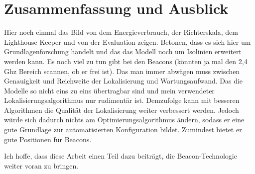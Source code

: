 \chapter{Zusammenfassung und Ausblick}

Hier noch einmal das Bild von dem Energieverbrauch, der Richterskala, dem Lighthouse Keeper und von der Evaluation zeigen. Betonen, dass es sich hier um Grundlagenforschung handelt und das das Modell noch um Isolinien erweitert werden kann. Es noch viel zu tun gibt bei den Beacons (könnten ja mal den 2,4 Ghz Bereich scannen, ob er frei ist). Das man immer abwägen muss zwischen Genauigkeit und Reichweite der Lokalisierung und Wartungsaufwand. Das die Modelle so nicht eins zu eins übertragbar sind und mein verwendeter Lokalisierungsalgorithmus nur rudimentär ist. Demzufolge kann mit besseren Algorithmen die Qualität der Lokalisierung weiter verbessert werden. Jedoch würde sich dadurch nichts am Optimierungsalgorithmus ändern, sodass er eine gute Grundlage zur automatisierten Konfiguration bildet. Zumindest bietet er gute Positionen für Beacons. 

Ich hoffe, dass diese Arbeit einen Teil dazu beiträgt, die Beacon-Technologie weiter voran zu bringen. 